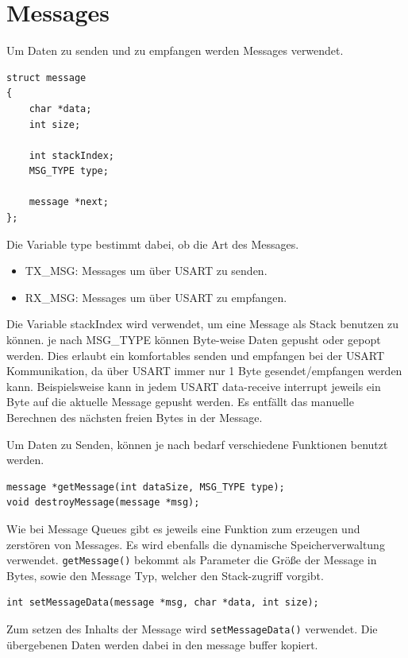 \documentclass[fontsize=12pt, toc=bibliography, notitlepage]{scrreprt}
\begin{document}
\section{Messages}
\label{subsec:shell-messages}
Um Daten zu senden und zu empfangen werden Messages verwendet.

\begin{lstlisting}
struct message
{
	char *data;
	int size;

	int stackIndex;
	MSG_TYPE type;

	message *next;
};
\end{lstlisting}

Die Variable type bestimmt dabei, ob die Art des Messages.
\begin{itemize}
	\item TX\_MSG: Messages um über USART zu senden.
	\item RX\_MSG: Messages um über USART zu empfangen.
\end{itemize}

Die Variable stackIndex wird verwendet, um eine Message als Stack benutzen zu können. je nach MSG\_TYPE können Byte-weise Daten gepusht oder gepopt werden. Dies erlaubt ein komfortables senden und empfangen bei der USART Kommunikation, da über USART immer nur 1 Byte gesendet/empfangen werden kann. Beispielsweise kann in jedem USART data-receive interrupt jeweils ein Byte auf die aktuelle Message gepusht werden. Es entfällt das manuelle Berechnen des nächsten freien Bytes in der Message.

Um Daten zu Senden, können je nach bedarf verschiedene Funktionen benutzt werden.

\begin{lstlisting}
message *getMessage(int dataSize, MSG_TYPE type);
void destroyMessage(message *msg);
\end{lstlisting}

Wie bei Message Queues gibt es jeweils eine Funktion zum erzeugen und zerstören von Messages. Es wird ebenfalls die dynamische Speicherverwaltung verwendet. \lstinline$getMessage()$ bekommt als Parameter die Größe der Message in Bytes, sowie den Message Typ, welcher den Stack-zugriff vorgibt.

\begin{lstlisting}
int setMessageData(message *msg, char *data, int size);
\end{lstlisting}

Zum setzen des Inhalts der Message wird \lstinline$setMessageData()$ verwendet. Die übergebenen Daten werden dabei in den message buffer kopiert.
\end{document}
